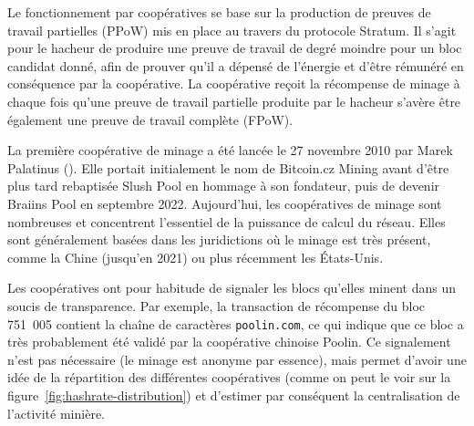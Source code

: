 Le fonctionnement par coopératives se base sur la production de preuves de travail partielles (PPoW) mis en place au travers du protocole Stratum. Il s'agit pour le hacheur de produire une preuve de travail de degré moindre pour un bloc candidat donné, afin de prouver qu'il a dépensé de l'énergie et d'être rémunéré en conséquence par la coopérative. La coopérative reçoit la récompense de minage à chaque fois qu'une preuve de travail partielle produite par le hacheur s'avère être également une preuve de travail complète (FPoW).


La première coopérative de minage a été lancée le 27 novembre 2010 par Marek Palatinus (). Elle portait initialement le nom de Bitcoin.cz Mining avant d'être plus tard rebaptisée Slush Pool en hommage à son fondateur, puis de devenir Braiins Pool en septembre 2022. Aujourd'hui, les coopératives de minage sont nombreuses et concentrent l'essentiel de la puissance de calcul du réseau. Elles sont généralement basées dans les juridictions où le minage est très présent, comme la Chine (jusqu'en 2021) ou plus récemment les États-Unis.

Les coopératives ont pour habitude de signaler les blocs qu'elles minent dans un soucis de transparence. Par exemple, la transaction de récompense du bloc 751~005 contient la chaîne de caractères \texttt{poolin.com}, ce qui indique que ce bloc a très probablement été validé par la coopérative chinoise Poolin. Ce signalement n'est pas nécessaire (le minage est anonyme par essence), mais permet d'avoir une idée de la répartition des différentes coopératives (comme on peut le voir sur la figure~\ref{fig:hashrate-distribution}) et d'estimer par conséquent la centralisation de l'activité minière.


